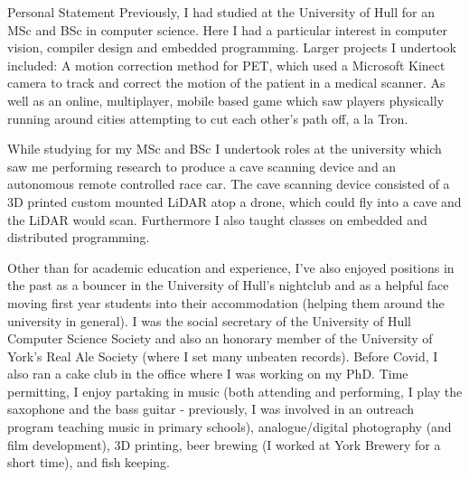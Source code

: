 \documentclass{cv}
\begin{document}
\begin{rSection}{Personal Statement}
        Previously, I had studied at the University of Hull for an MSc and BSc in computer science. Here I had a particular interest in computer vision, compiler design and embedded programming. Larger projects I undertook included: A motion correction method for PET, which used a Microsoft Kinect camera to track and correct the motion of the patient in a medical scanner. As well as an online, multiplayer, mobile based game which saw players physically running around cities attempting to cut each other's path off, a la Tron.
        
        While studying for my MSc and BSc I undertook roles at the university which saw me performing research to produce a cave scanning device and an autonomous remote controlled race car. The cave scanning device consisted of a 3D printed custom mounted LiDAR atop a drone, which could fly into a cave and the LiDAR would scan. Furthermore I also taught classes on embedded and distributed programming.
        
        Other than for academic education and experience, I've also enjoyed positions in the past as a bouncer in the University of Hull's nightclub and as a helpful face moving first year students into their accommodation (helping them around the university in general). I was the social secretary of the University of Hull Computer Science Society and also an honorary member of the University of York's Real Ale Society (where I set many unbeaten records). Before Covid, I also ran a cake club in the office where I was working on my PhD. Time permitting, I enjoy partaking in music (both attending and performing, I play the saxophone and the bass guitar - previously, I was involved in an outreach program teaching music in primary schools), analogue/digital photography (and film development), 3D printing, beer brewing (I worked at York Brewery for a short time), and fish keeping.
    \end{rSection}

    \newpage
    
\end{document}
